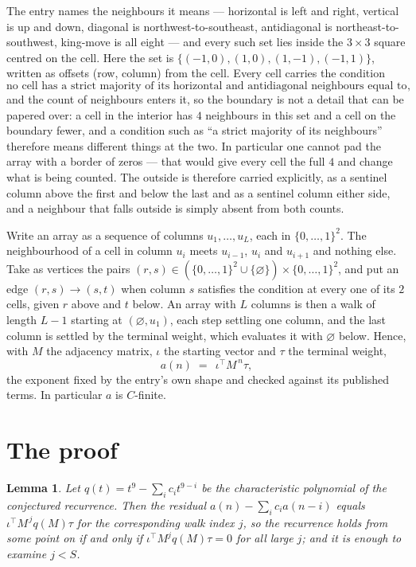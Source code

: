 \documentclass[11pt,a4paper]{article}
\theoremstyle{plain}
\newtheorem{lemma}[theorem]{Lemma}
\theoremstyle{definition}
\begin{document}
The entry names the neighbours it means --- horizontal is left and right, vertical is up and
down, diagonal is northwest-to-southeast, antidiagonal is northeast-to-southwest, king-move is
all eight --- and every such set lies inside the $3\times3$ square centred on the cell. Here
the set is $\{(-1,0), (1,0), (1,-1), (-1,1)\}$, written as offsets (row, column) from the cell. Every cell carries
the condition
\[
\text{no cell has a strict majority of its horizontal and antidiagonal neighbours equal to 1},
\]
and the count of neighbours enters it, so the boundary is not a detail that can be papered
over: a cell in the interior has $4$ neighbours in this set and a cell on the boundary
fewer, and a condition such as ``a strict majority of its neighbours'' therefore means
different things at the two. In particular one cannot pad the array with a border of zeros ---
that would give every cell the full $4$ and change what is being counted. The outside is
therefore carried
explicitly, as a sentinel column above the first and below the last and as a sentinel column
either side, and a neighbour that falls outside is simply absent from both counts.

Write an array as a sequence of columns $u_1,\dots,u_L$, each in
$\{0,\dots,1\}^{2}$. The neighbourhood of a cell in column $u_i$ meets $u_{i-1}$,
$u_i$ and $u_{i+1}$ and nothing else. Take as vertices the pairs
$(r,s)\in(\{0,\dots,1\}^{2}\cup\{\varnothing\})\times\{0,\dots,1\}^{2}$,
and put an edge $(r,s)\to(s,t)$ when column $s$ satisfies the condition at every one of its
$2$ cells, given $r$ above and $t$ below. An array with $L$ columns is then a walk of length
$L-1$ starting at $(\varnothing,u_1)$, each step settling one column, and the last column is
settled by the terminal weight, which evaluates it with $\varnothing$ below. Hence,
with $M$ the adjacency matrix, $\iota$ the starting vector and $\tau$ the terminal weight,
\[
a(n)\;=\;\,\iota^{\!\top}M^{\,n}\tau ,
\]
the exponent fixed by the entry's own shape and checked against its published terms. In
particular $a$ is $C$-finite.

\section{The proof}

\begin{lemma}\label{lem:crit}
Let $q(t)=t^{9}-\sum_i c_it^{9-i}$ be the characteristic polynomial of the
conjectured recurrence. Then the residual $a(n)-\sum_ic_ia(n-i)$ equals
$\iota^{\!\top}M^{\,j}q(M)\tau$ for the corresponding walk index $j$, so the
recurrence holds from some point on if and only if $\iota^{\!\top}M^{j}q(M)\tau=0$ for all
large $j$; and it is enough to examine $j<S$.
\end{lemma}
\end{document}
